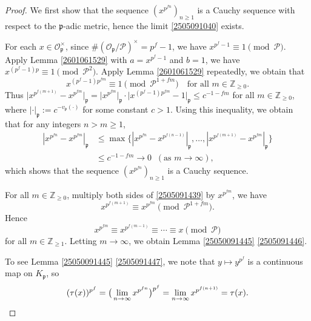 \documentclass[10pt,a4paper]{amsart}
\newcommand{\Z}{\mathbb Z}
\begin{document}
	\begin{proof}
		We first show that the sequence $(x^{p^{fn}})_{n\ge1}$ is a Cauchy sequence with respect to the $\mathfrak{p}$-adic metric, hence the limit \eqref{2505091040} exists.
		
		For each $x\in\mathcal{O}_{\mathfrak{p}}^{\times}$, since $\#(\mathcal{O}_{\mathfrak{p}}/\mathcal{P})^\times=p^f-1$,  we have $x^{p^f-1}\equiv1\pmod{\mathcal{P}}$.
		Apply Lemma \ref{2601061529} with $a=x^{p^f-1}$ and $b=1$, we have $x^{(p^f-1)p}\equiv1\pmod{\mathcal{P}^{2}}$. Apply Lemma \ref{2601061529} repeatedly, we obtain that
		\begin{equation}\label{2505091439}
			x^{(p^f-1)p^{fm}}\equiv 1\!\!\pmod{\mathcal{P}^{1+fm}}\quad\text{for all $m\in\Z_{\ge0}$}.
		\end{equation}
		Thus $\big|x^{p^{f(m+1)}}- x^{p^{fm}}\big|_{\mathfrak{p}}=\big|x^{p^{fm}}\big|_{\mathfrak{p}}\cdot\big|x^{(p^f-1)p^{fm}}-1\big|_{\mathfrak{p}}\le c^{-1-fm}$ for all $m\in\Z_{\ge0}$, where $|\cdot|_\mathfrak{p}:=c^{-v_{\mathfrak{p}}(\cdot)}$ for some constant $c>1$. Using this inequality, we obtain that for any integers $n>m\ge1$, 
		\[\begin{split}
			|x^{p^{fn}}- x^{p^{fm}}|_{\mathfrak{p}}&\le\max\big\{|x^{p^{fn}}- x^{p^{f(n-1)}}|_{\mathfrak{p}},\dots,|x^{p^{f(m+1)}}- x^{p^{fm}}|_{\mathfrak{p}}\big\}\\
			&\le c^{-1-fm}\to0\;\;(\text{as } m\to\infty),
		\end{split}\]
		which shows that the sequence $(x^{p^{fn}})_{n\ge1}$ is a Cauchy sequence.
		
		For all $m\in\Z_{\ge0}$, multiply both sides of \eqref{2505091439} by $x^{p^{fm}}$, we have
		\[x^{p^{f(m+1)}}\equiv x^{p^{fm}}\pmod{\mathcal{P}^{1+fm}}.\]
		Hence
		\[x^{p^{fm}}\equiv x^{p^{f(m-1)}}\equiv\cdots\equiv x\pmod{\mathcal{P}}\]
		for all $m\in\Z_{\ge1}$. Letting $m\to\infty$, we obtain Lemma \ref{25050091445} \eqref{2505091446}. 
		
		To see Lemma \ref{25050091445} \eqref{2505091447}, we note that $y\mapsto y^{p^f}$ is a continuous map on $K_{\mathfrak{p}}$, so
		\[(\tau(x))^{p^f}=\big(\lim_{n\to\infty}x^{p^{fn}}\big)^{p^f}=\lim_{n\to\infty}x^{p^{f(n+1)}}=\tau(x).\qedhere\]
	\end{proof}
\end{document}
